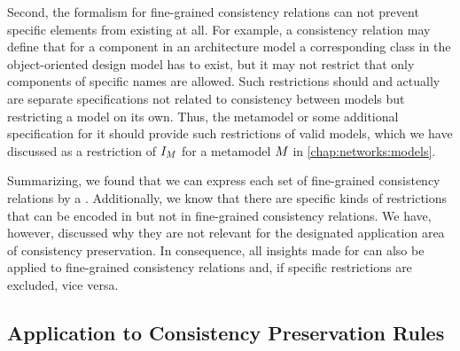 Second, the formalism for fine-grained consistency relations can not prevent specific elements from existing at all.
For example, a consistency relation may define that for a component in an architecture model a corresponding class in the object-oriented design model has to exist, but it may not restrict that only components of specific names are allowed.
Such restrictions should and actually are separate specifications not related to consistency between models but restricting a model on its own.
Thus, the metamodel or some additional specification for it should provide such restrictions of valid models, which we have discussed as a restriction of $\metamodelinstanceset{M}{}$ for a metamodel $\metamodel{M}{}$ in \autoref{chap:networks:models}.

Summarizing, we found that we can express each set of fine-grained consistency relations by a \modellevelconsistencyrelation.
Additionally, we know that there are specific kinds of restrictions that can be encoded in \modellevelconsistencyrelations but not in fine-grained consistency relations.
We have, however, discussed why they are not relevant for the designated application area of consistency preservation.
In consequence, all insights made for \modellevelconsistencyrelations can also be applied to fine-grained consistency relations and, if specific restrictions are excluded, vice versa.



\subsection{Application to Consistency Preservation Rules}
\label{chap:correctness:finegrained:rules}

